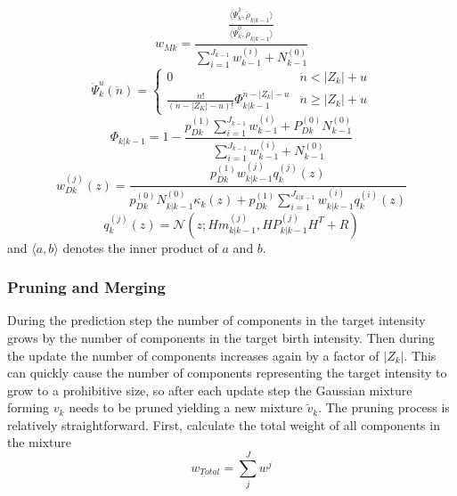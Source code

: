 \documentclass{article}
\begin{document}
\begin{equation}
  \label{eq:wmk}
  w_{Mk} = \frac{\frac{\langle\ddot{\Psi}_k^1,\ddot{\rho}_{k|k-1}\rangle}{\langle\ddot{\Psi}_k^0,\ddot{\rho}_{k|k-1}\rangle}}{\sum_{i=1}^{J_{k-1}}w_{k-1}^{(i)} + N_{k-1}^{(0)}}
\end{equation}
\begin{equation}
  \label{eq:psi}
  \ddot{\Psi}_k^u(\ddot{n}) =
  \begin{cases}
    0 & \ddot{n} < |Z_k| + u \\
   \frac{\ddot{n}!}{(\ddot{n}-|Z_K|-u)!}\Phi_{k|k-1}^{\ddot{n} - |Z_k|-u} & \ddot{n} \ge |Z_k|+u
  \end{cases}
\end{equation}
\begin{equation}
  \label{eq:Phi}
  \Phi_{k|k-1} = 1 - \frac{p_{Dk}^{(1)}\sum_{i=1}^{J_{k-1}}w_{k-1}^{(i)} + P_{Dk}^{(0)}N_{k-1}^{(0)}}{\sum_{i=1}^{J_{k-1}}w_{k-1}^{(i)} + N_{k-1}^{(0)}}
\end{equation}
\begin{equation}
  \label{eq:wD}
  w_{Dk}^{(j)}(z) = \frac{p_{Dk}^{(1)}w_{k|k-1}^{(j)}q_k^{(j)}(z)}{p_{Dk}^{(0)}N_{k|k-1}^{(0)}\kappa_k(z) +  p_{Dk}^{(1)}\sum_{i=1}^{J_{k|k-1}}w_{k|k-1}^{(i)}q_k^{(i)}(z)  }
\end{equation}
\begin{equation}
  \label{eq:qz}
  q_k^{(j)}(z) = \mathcal{N}(z;Hm_{k|k-1}^{(j)}, HP_{k|k-1}^{(j)}H^T + R)
\end{equation}
and $\langle a, b \rangle$ denotes the inner product of $a$ and $b$.

\subsubsection*{Pruning and Merging}
During the prediction step the number of components in the target intensity grows by the number of components in the target birth intensity. Then during the update the number of components increases again by a factor of $|Z_k|$. This can quickly cause the number of components representing the target intensity to grow to a prohibitive size, so after each update step the Gaussian mixture forming $v_{k}$ needs to be pruned yielding a new mixture $\tilde{v}_k$. The pruning process is relatively straightforward. First, calculate the total weight of all components in the mixture
\begin{equation}
  \label{eq:wtotal}
  w_{Total} = \sum_j^Jw^j
\end{equation}
\end{document}
